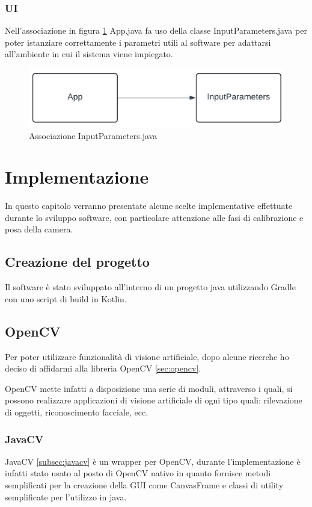 \documentclass[12pt,a4paper,openright,twoside]{book}
\begin{document}
\subsection{UI}
Nell'associazione in figura \ref{fig:UI} App.java fa uso della classe InputParameters.java per poter istanziare correttamente i parametri utili al software per adattarsi all'ambiente in cui il sistema viene impiegato.
\begin{figure}
	\centering
	\includegraphics[width=0.5\linewidth]{./figures/UML/UI.png}
	\caption{Associazione InputParameters.java}
	\label{fig:UI}
\end{figure}


\chapter{Implementazione}
In questo capitolo verranno presentate alcune scelte implementative effettuate durante lo sviluppo software, con particolare attenzione alle fasi di calibrazione e posa della camera.

\section{Creazione del progetto}
Il software è stato sviluppato all'interno di un progetto java utilizzando Gradle con uno script di build in Kotlin.

\section{OpenCV}
Per poter utilizzare funzionalità di visione artificiale, dopo alcune ricerche ho deciso di affidarmi alla libreria OpenCV \ref{sec:opencv}.

OpenCV mette infatti a disposizione una serie di moduli, attraverso i quali, si possono realizzare applicazioni di visione artificiale di ogni tipo quali: rilevazione di oggetti, riconoscimento facciale, ecc.

\subsection{JavaCV}
JavaCV \ref{subsec:javacv} è un wrapper per OpenCV, durante l'implementazione è infatti stato usato al posto di OpenCV nativo in quanto fornisce metodi semplificati per la creazione della GUI come CanvasFrame e classi di utility semplificate per l'utilizzo in java.
\end{document}
